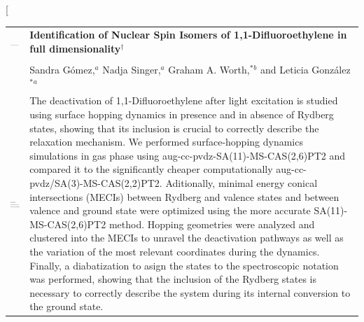 \documentclass[twoside,twocolumn,9pt]{article}
\begin{document}
\twocolumn[
  \begin{@twocolumnfalse}
\vspace{3cm}
\sffamily
\begin{tabular}{m{4.5cm} p{13.5cm} }

\includegraphics{head_foot/DOI} & \noindent\LARGE{\textbf{Identification of Nuclear Spin Isomers of 1,1-Difluoroethylene in full dimensionality$^\dag$}} \\%
\vspace{0.3cm} & \vspace{0.3cm} \\

 & \noindent\large{Sandra G\'omez,\textit{$^{a}$} Nadja Singer,\textit{$^{a}$} Graham A. Worth,$^{\ast}$\textit{$^{b}$} and Leticia Gonz\'alez$^{\ast}$\textit{$^{a}$}} \\%
\includegraphics{head_foot/dates} & \noindent\normalsize{The deactivation of 1,1-Difluoroethylene after light excitation is studied using surface hopping dynamics in presence and in absence of Rydberg states, showing that its inclusion is crucial to correctly describe the relaxation mechanism. We performed surface-hopping dynamics simulations in gas phase using aug-cc-pvdz-SA(11)-MS-CAS(2,6)PT2  and compared it to the significantly cheaper computationally aug-cc-pvdz/SA(3)-MS-CAS(2,2)PT2. Aditionally, minimal energy conical intersections (MECIs) between Rydberg and valence states and between valence and ground state were optimized using the more accurate SA(11)-MS-CAS(2,6)PT2 method. Hopping geometries were analyzed and clustered into the MECIs to unravel the deactivation pathways as well as the variation of the most relevant coordinates during the dynamics. Finally, a diabatization to asign the states to the spectroscopic notation was performed, showing that the inclusion of the Rydberg states is necessary to correctly describe the system during its internal conversion to the ground state.} \\
\end{tabular}

 \end{@twocolumnfalse} \vspace{0.6cm}
\end{document}

